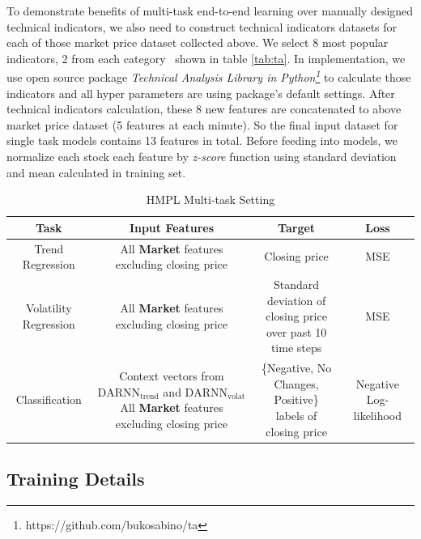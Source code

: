 \documentclass[sigconf, anonymous, review]{acmart}
\renewcommand{\cite}{\citep}
\begin{document}
To demonstrate benefits of multi-task end-to-end learning over
manually designed technical indicators, we also need to construct
technical indicators datasets for each of those market price
dataset collected above. We select 8 most popular indicators, 2
from each category~\cite{kirkpatrick2010technical} shown in table
\ref{tab:ta}. In implementation, we use open source package
\emph{Technical Analysis Library in
  Python\footnote{https://github.com/bukosabino/ta}} to calculate
those indicators and all hyper parameters are using package's
default settings. After technical indicators calculation, these 8
new features are concatenated to above market price dataset (5
features at each minute). So the final input dataset for single
task models contains 13 features in total. Before feeding into
models, we normalize each stock each feature by \emph{z-score}
function using standard deviation and mean calculated in training
set.

\begin{table}[t]
\centering
\caption{HMPL Multi-task Setting}
\begin{tabular}{|c|c|c|c|} \hline
  Task & Input Features & Target & Loss\\ \hline
  Trend Regression& \makecell{All \textbf{Market} features\\excluding closing price }& Closing price & MSE\\ \hline
  Volatility Regression& \makecell{All \textbf{Market} features\\excluding closing price }& \makecell{Standard deviation of closing price\\over past 10 time steps}& MSE\\ \hline
  Classification& \makecell{Context vectors from \\ $\text{DARNN}_{\text{trend}}$ and $\text{DARNN}_{\text{volat}}$\\All \textbf{Market} features\\excluding closing price} & \makecell{\{Negative, No Changes, Positive\} \\labels of closing price }& Negative Log-likelihood\\ \hline
\end{tabular}
  \label{tab:multi}
\end{table}

\subsection{Training Details}
\label{sec:train_detail}
\end{document}
